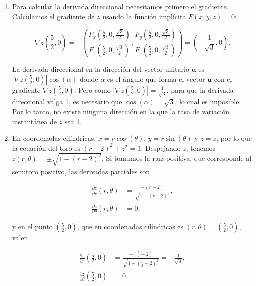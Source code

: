 \documentclass[
  spanish,
  a4paper,
]{scrreport}
\theoremstyle{definition}
\theoremstyle{remark}
\begin{document}
\begin{tcolorbox}
\begin{enumerate}
\begin{figure}[H]
{  }

  \caption{Plano tangente al toro}

  \end{figure}%
\item
  Para calcular la derivada direccional necesitamos primero el
  gradiente. Calculamos el gradiente de \(z\) usando la función
  implícita \(F(x,y,z) = 0\):

  \[
  \nabla z\left(\frac{5}{2},0\right) 
  = -\left(\frac{F_x\left(\frac{5}{2},0,\frac{\sqrt{3}}{2}\right)}{F_z\left(\frac{5}{2},0,\frac{\sqrt{3}}{2}\right)}, \frac{F_y\left(\frac{5}{2},0,\frac{\sqrt{3}}{2}\right)}{F_z\left(\frac{5}{2},0,\frac{\sqrt{3}}{2}\right)}\right)
  = \left(-\frac{1}{\sqrt{3}}, 0\right).
  \]

  La derivada direccional en la dirección del vector unitario
  \(\mathbf{u}\) es
  \(|\nabla z\left(\frac{5}{2},0\right)| \cos(\alpha)\) donde \(\alpha\)
  es el ángulo que forma el vector \(\mathbf{u}\) con el gradiente
  \(\nabla z\left(\frac{5}{2},0\right)\). Pero como
  \(|\nabla z\left(\frac{5}{2},0\right)| = \frac{1}{\sqrt{3}}\), para
  que la derivada direccional valga 1, es necesario que
  \(\cos(\alpha) = \sqrt{3}\), lo cual es imposible. Por lo tanto, no
  existe ninguna dirección en la que la tasa de variación instantánea de
  \(z\) sea 1.
\item
  En coordenadas cilíndricas, \(x = r\cos(\theta)\),
  \(y = r\sin(\theta)\) y \(z = z\), por lo que la ecuación del toro es
  \(\left(r - 2\right)^{2}+z^{2}=1\). Despejando \(z\), tenemos
  \(z(r,\theta) = \pm\sqrt{1 - (r - 2)^2}\). Si tomamos la raíz
  positiva, que corresponde al semitoro positivo, las derivadas
  parciales son

  \begin{align*}
  \frac{\partial z}{\partial r}(r,\theta) &= \frac{-(r - 2)}{\sqrt{1 - (r - 2)^2}}, \\
  \frac{\partial z}{\partial \theta}(r,\theta) &= 0.
  \end{align*}

  y en el punto \(\left(\frac{5}{2},0\right)\), que en coordenadas
  cilíndricas es \((r,\theta) = \left(\frac{5}{2},0\right)\), valen

  \begin{align*}
  \frac{\partial z}{\partial r}\left(\frac{5}{2},0\right) &= \frac{-\left(\frac{5}{2} - 2\right)}{\sqrt{1 - \left(\frac{5}{2} - 2\right)^2}} =  -\frac{1}{\sqrt{3}}, \\
  \frac{\partial z}{\partial \theta}\left(\frac{5}{2},0\right) &= 0.
  \end{align*}


\end{enumerate}
\end{tcolorbox}
\end{document}
